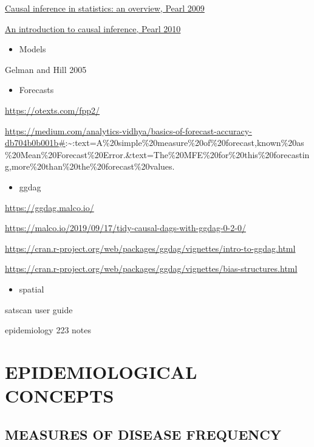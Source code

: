 \documentclass[
]{article}
\providecommand{\tightlist}{%
  \setlength{\itemsep}{0pt}\setlength{\parskip}{0pt}}
\begin{document}
\href{https://projecteuclid.org/euclid.ssu/1255440554http://projecteuclid.org/euclid.ssu/1255440554}{Causal
inference in statistics: an overview, Pearl 2009}

\href{https://www.ncbi.nlm.nih.gov/pmc/articles/PMC2836213/}{An
introduction to causal inference, Pearl 2010}

\begin{itemize}
\tightlist
\item
  Models
\end{itemize}

Gelman and Hill 2005

\begin{itemize}
\tightlist
\item
  Forecasts
\end{itemize}

\url{https://otexts.com/fpp2/}

\url{https://medium.com/analytics-vidhya/basics-of-forecast-accuracy-db704b0b001b\#}:\textasciitilde:text=A\%20simple\%20measure\%20of\%20forecast,known\%20as\%20Mean\%20Forecast\%20Error.\&text=The\%20MFE\%20for\%20this\%20forecasting,more\%20than\%20the\%20forecast\%20values.

\begin{itemize}
\tightlist
\item
  ggdag
\end{itemize}

\url{https://ggdag.malco.io/}

\url{https://malco.io/2019/09/17/tidy-causal-dags-with-ggdag-0-2-0/}

\url{https://cran.r-project.org/web/packages/ggdag/vignettes/intro-to-ggdag.html}

\url{https://cran.r-project.org/web/packages/ggdag/vignettes/bias-structures.html}

\begin{itemize}
\tightlist
\item
  spatial
\end{itemize}

satscan user guide

epidemiology 223 notes

\hypertarget{epidemiological-concepts}{%
\section{\texorpdfstring{\textbf{EPIDEMIOLOGICAL
CONCEPTS}}{EPIDEMIOLOGICAL CONCEPTS}}\label{epidemiological-concepts}}

\hypertarget{measures-of-disease-frequency}{%
\subsection{MEASURES OF DISEASE
FREQUENCY}\label{measures-of-disease-frequency}}
\end{document}
